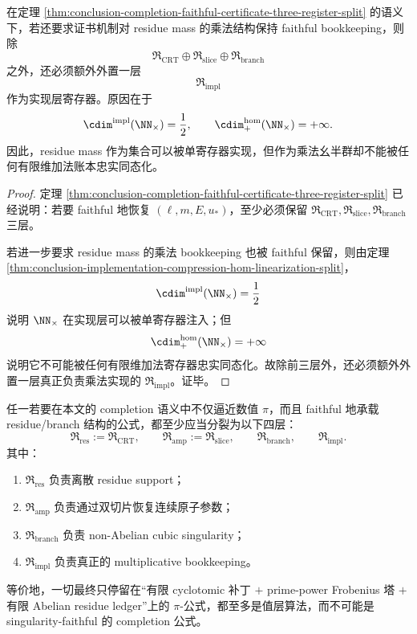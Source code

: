 \begin{corollary}\label{cor:conclusion-completion-faithful-certificate-fourth-implementation-layer}
在定理 \ref{thm:conclusion-completion-faithful-certificate-three-register-split} 的语义下，若还要求证书机制对 residue mass 的乘法结构保持 faithful bookkeeping，则除
\[
\mathfrak R_{\mathrm{CRT}}
\oplus
\mathfrak R_{\mathrm{slice}}
\oplus
\mathfrak R_{\mathrm{branch}}
\]
之外，还必须额外外置一层
\[
\mathfrak R_{\mathrm{impl}}
\]
作为实现层寄存器。原因在于
\[
\cdim^{\mathrm{impl}}(\NN_\times)=\frac12,
\qquad
\cdim^{\mathrm{hom}}_{+}(\NN_\times)=+\infty.
\]
因此，residue mass 作为集合可以被单寄存器实现，但作为乘法幺半群却不能被任何有限维加法账本忠实同态化。
\end{corollary}
\begin{proof}
定理 \ref{thm:conclusion-completion-faithful-certificate-three-register-split} 已经说明：若要 faithful 地恢复 \((\ell,m,E,u_\ast)\)，至少必须保留
\(
\mathfrak R_{\mathrm{CRT}},
\mathfrak R_{\mathrm{slice}},
\mathfrak R_{\mathrm{branch}}
\)
三层。

若进一步要求 residue mass 的乘法 bookkeeping 也被 faithful 保留，则由定理 \ref{thm:conclusion-implementation-compression-hom-linearization-split}，
\[
\cdim^{\mathrm{impl}}(\NN_\times)=\frac12
\]
说明 \(\NN_\times\) 在实现层可以被单寄存器注入；但
\[
\cdim^{\mathrm{hom}}_{+}(\NN_\times)=+\infty
\]
说明它不可能被任何有限维加法寄存器忠实同态化。故除前三层外，还必须额外外置一层真正负责乘法实现的 \(\mathfrak R_{\mathrm{impl}}\)。证毕。
\end{proof}

\begin{conjecture}\label{conj:conclusion-piformula-residue-slice-branch-implementation-split}
任一若要在本文的 completion 语义中不仅逼近数值 \(\pi\)，而且 faithful 地承载 residue/branch 结构的公式，都至少应当分裂为以下四层：
\[
\mathfrak R_{\mathrm{res}}:=\mathfrak R_{\mathrm{CRT}},
\qquad
\mathfrak R_{\mathrm{amp}}:=\mathfrak R_{\mathrm{slice}},
\qquad
\mathfrak R_{\mathrm{branch}},
\qquad
\mathfrak R_{\mathrm{impl}}.
\]
其中：
\begin{enumerate}
  \item \(\mathfrak R_{\mathrm{res}}\) 负责离散 residue support；
  \item \(\mathfrak R_{\mathrm{amp}}\) 负责通过双切片恢复连续原子参数；
  \item \(\mathfrak R_{\mathrm{branch}}\) 负责 non-Abelian cubic singularity；
  \item \(\mathfrak R_{\mathrm{impl}}\) 负责真正的 multiplicative bookkeeping。
\end{enumerate}
等价地，一切最终只停留在“有限 cyclotomic 补丁 \(+\) prime-power Frobenius 塔 \(+\) 有限 Abelian residue ledger”上的 \(\pi\)-公式，都至多是值层算法，而不可能是 singularity-faithful 的 completion 公式。
\end{conjecture}

\endinput

